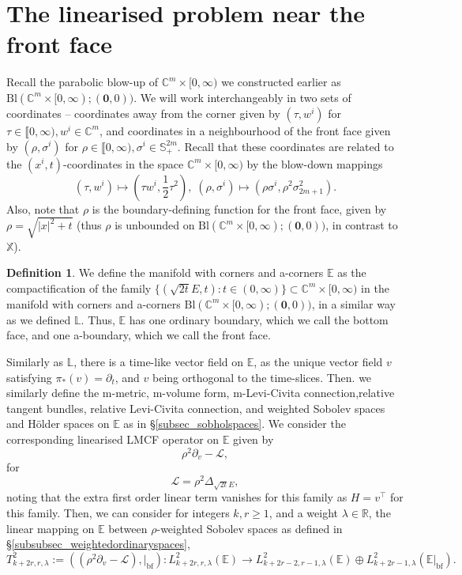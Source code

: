 \documentclass[10pt, a4paper]{article}
\theoremstyle{plain}%
\theoremstyle{definition}
\newtheorem{defn}[theorem]{Definition}
\numberwithin{figure}{section}
\numberwithin{equation}{section}
\newcommand{\bL}{\mathbb{L}}
\newcommand{\bX}{\mathbb{X}}
\newcommand{\bR}{\mathbb{R}}
\newcommand{\bC}{\mathbb{C}}
\newcommand{\bS}{\mathbb{S}}
\newcommand{\bE}{\mathbb{E}}
\newcommand{\pa}{\partial}
\newcommand{\rt}{\rightarrow}
\newcommand{\cL}{\mathcal{L}}
\newcommand{\botf}{\textrm{bf}}
\newcommand{\Bl}{\mathrm{Bl}(\mathbb{C}^m\times[0,\infty); (\mathbf{0},0))}
\begin{document}
\section{The linearised problem near the front face}\label{sec_parabolicfredholmexpanders}
Recall the parabolic blow-up of $\bC^m\times[0,\infty)$ we constructed earlier as $\Bl$. We will work interchangeably in two sets of coordinates -- coordinates away from the corner given by $(\tau,w^i)$ for $\tau\in \llbracket 0,\infty), w^i\in \bC^m$, and coordinates in a neighbourhood of the front face given by $(\rho,\sigma^i)$ for $\rho\in\llbracket 0,\infty), \sigma^i\in \bS^{2m}_+$. Recall that these coordinates are related to the $(x^i,t)$-coordinates in the space $\bC^m\times[0,\infty)$ by the blow-down mappings 
\begin{equation}\label{eq_blowdownmappingssecfive}
(\tau,w^i) \mapsto \left(\tau w^i, \frac{1}{2}\tau^2\right),\; (\rho,\sigma^i) \mapsto \left(\rho\sigma^i, \rho^2\sigma_{2m+1}^2 \right).
\end{equation}
Also, note that $\rho$ is the boundary-defining function for the front face, given by $\rho=\sqrt{|x|^2+t}$ (thus $\rho$ is unbounded on $\Bl$, in contrast to $\bX$).  
\begin{defn}
	We define the manifold with corners and a-corners $\bE$ as the compactification of the family $\{(\sqrt{2t}E,t) : t\in (0,\infty)\} \subset \bC^m\times[0,\infty)$ in the manifold with corners and a-corners $\Bl$, in a similar way as we defined $\bL$. Thus, $\bE$ has one ordinary boundary, which we call the bottom face, and one a-boundary, which we call the front face.
\end{defn}
Similarly as $\bL$, there is a time-like vector field on $\bE$, as the unique vector field $v$ satisfying $\pi_*(v)=\pa_t$, and $v$ being orthogonal to the time-slices. Then. we similarly define the m-metric, m-volume form, m-Levi-Civita connection,relative tangent bundles, relative Levi-Civita connection, and weighted Sobolev spaces and H\"{o}lder spaces on $\bE$ as in \S \ref{subsec_sobholspaces}. We consider the corresponding linearised LMCF operator on $\bE$ given by \begin{equation}\label{eq_linearisedoperatorE}
\rho^2\pa_v-\cL,
\end{equation}
 for \[
\cL = \rho^2\Delta_{\sqrt{2t}E},
\]
noting that the extra first order linear term vanishes for this family as $H=v^\top$ for this family. Then, we can consider for integers $k,r \geq 1$, and a weight $\lambda\in \bR$, the linear mapping on $\bE$ between $\rho$-weighted Sobolev spaces as defined in \S \ref{subsubsec_weightedordinaryspaces}, 
\begin{equation}\label{eq_sobolevmappingE}
	T^2_{k+2r,r,\lambda}:= ((\rho^2\pa_v- \cL),|_{\botf}) :L^2_{k+2r,r,\lambda}(\bE) \rt L^2_{k+2r-2,r-1,\lambda}(\bE)\oplus L^2_{k+2r-1,\lambda}(\bE|_{\botf}).
\end{equation}
\end{document}
